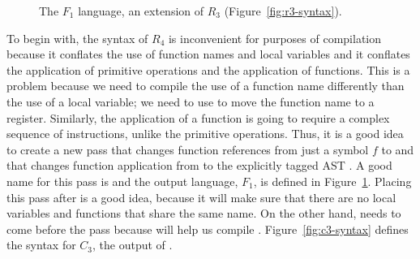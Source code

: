 \documentclass[11pt]{book}
\newcommand{\gray}[1]{{\color{lightgray} #1}}
\begin{document}
\begin{figure}[tp]
\centering
\fbox{
\begin{minipage}{0.96\textwidth}
\[
\begin{array}{lcl}
  \Type &::=& \gray{ \key{Integer} \mid \key{Boolean}
         \mid (\key{Vector}\;\Type^{+}) \mid \key{Void}  } \mid (\Type^{*} \; \key{->}\; \Type) \\
  \Exp &::=& \gray{ \Int \mid (\key{read}) \mid (\key{-}\;\Exp) \mid (\key{+} \; \Exp\;\Exp)}  \\
     &\mid&  (\key{function-ref}\, \itm{label})
     \mid \gray{ \Var \mid \LET{\Var}{\Exp}{\Exp} }\\
  &\mid& \gray{ \key{\#t} \mid \key{\#f} \mid
      (\key{and}\;\Exp\;\Exp) \mid (\key{not}\;\Exp)} \\
      &\mid& \gray{(\itm{cmp}\;\Exp\;\Exp) \mid \IF{\Exp}{\Exp}{\Exp}} \\
  &\mid& \gray{(\key{vector}\;\Exp^{+}) \mid
    (\key{vector-ref}\;\Exp\;\Int)} \\
  &\mid& \gray{(\key{vector-set!}\;\Exp\;\Int\;\Exp)\mid (\key{void})} \\
      &\mid& (\key{app}\, \Exp \; \Exp^{*}) \\
  \Def &::=& (\key{define}\; (\itm{label} \; [\Var \key{:} \Type]^{*}) \key{:} \Type \; \Exp) \\
  F_1 &::=& (\key{program} \; \Def^{*} \; \Exp)
\end{array}
\]
\end{minipage}
}
\caption{The $F_1$ language, an extension of $R_3$
  (Figure~\ref{fig:r3-syntax}).}
\label{fig:f1-syntax}
\end{figure}


To begin with, the syntax of $R_4$ is inconvenient for purposes of
compilation because it conflates the use of function names and local
variables and it conflates the application of primitive operations and
the application of functions. This is a problem because we need to
compile the use of a function name differently than the use of a local
variable; we need to use  to move the function name to a
register. Similarly, the application of a function is going to require
a complex sequence of instructions, unlike the primitive
operations. Thus, it is a good idea to create a new pass that changes
function references from just a symbol $f$ to  and that changes function application from  to the explicitly tagged AST . A good name for this pass is
 and the output language, $F_1$, is defined in
Figure~\ref{fig:f1-syntax}. Placing this pass after  is
a good idea, because it will make sure that there are no local
variables and functions that share the same name. On the other hand,
 needs to come before the  pass
because  will help us compile .
Figure~\ref{fig:c3-syntax} defines the syntax for $C_3$, the output of
.
\end{document}

